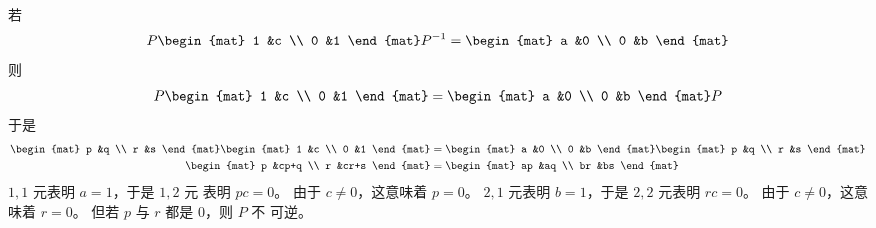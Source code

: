     \begin{answer}
      若
      \begin{equation*}
         P
         \begin{mat}
            1  &c  \\
            0  &1
         \end{mat}
         P^{-1}
         =
         \begin{mat}
            a  &0  \\
            0  &b
         \end{mat}
      \end{equation*}
      则
      \begin{equation*}
         P
         \begin{mat}
            1  &c  \\
            0  &1
         \end{mat}
         =
         \begin{mat}
            a  &0  \\
            0  &b
         \end{mat}
         P
      \end{equation*}
      于是
      \begin{align*}
         \begin{mat}
            p  &q  \\
            r  &s
         \end{mat}
         \begin{mat}
            1  &c  \\
            0  &1
         \end{mat}
         &=
         \begin{mat}
            a  &0  \\
            0  &b
         \end{mat}
         \begin{mat}
            p  &q  \\
            r  &s
         \end{mat}        \\
         \begin{mat}
            p  &cp+q  \\
            r  &cr+s
         \end{mat}
         &=
         \begin{mat}
            ap  &aq  \\
            br  &bs
         \end{mat}
      \end{align*}
      \( 1,1 \) 元表明 \( a=1 \)，于是 \( 1,2 \) 元
      表明 \( pc=0 \)。
      由于 \( c\neq 0 \)，这意味着 \( p=0 \)。
      \( 2,1 \) 元表明 
      \( b=1 \)，于是 \( 2,2 \) 元表明
      \( rc=0 \)。
      由于 \( c\neq 0 \)，这意味着 \( r=0 \)。
      但若 \( p \) 与 \( r \) 都是 \( 0 \)，则 \( P \) 不
      可逆。  
     \end{answer}
